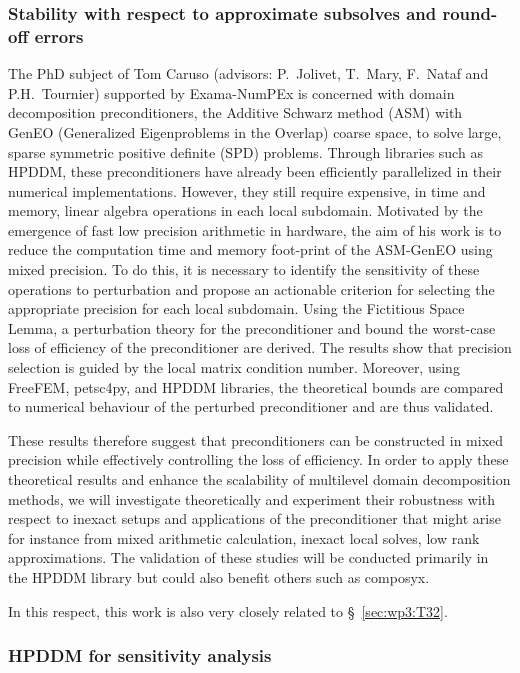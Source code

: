  \subsubsection{Stability with respect to approximate subsolves and round-off errors}
\label{sec:wp3:T31:ddmroundoff}
The PhD subject of Tom Caruso (advisors: P.~Jolivet, T.~Mary, F.~Nataf and P.H.~Tournier) supported by Exama-NumPEx is concerned with domain decomposition preconditioners, the Additive Schwarz method (ASM) with GenEO (Generalized Eigenproblems in the Overlap) coarse space, to solve large, sparse symmetric positive definite (SPD) problems. 
Through libraries such as HPDDM, these preconditioners have already been efficiently parallelized in their numerical implementations. 
However, they still require expensive, in time and memory, linear algebra operations in each local subdomain. 
Motivated by the emergence of fast low precision arithmetic in hardware, the aim of his work is to reduce the computation time and memory foot-print of the ASM-GenEO using mixed precision. 
To do this, it is necessary to identify the sensitivity of these operations to perturbation and propose an actionable criterion for selecting the appropriate precision for each local subdomain.
Using the Fictitious Space Lemma, a perturbation theory for the preconditioner and bound the worst-case loss of efficiency of the preconditioner are derived. The results show that  precision selection is guided by the local matrix condition number. 
Moreover, using FreeFEM, petsc4py, and HPDDM libraries, the theoretical bounds are compared to numerical behaviour of the perturbed preconditioner and are thus validated. 

These results therefore suggest that preconditioners can be constructed in mixed precision while effectively controlling the loss of efficiency. In order to apply these theoretical results and enhance the scalability of
multilevel domain decomposition methods, we will investigate theoretically and experiment their
robustness with respect to inexact setups and applications of the preconditioner that might arise for
instance from mixed arithmetic calculation, inexact local solves, low rank approximations. The
validation of these studies will be conducted primarily in the HPDDM library but could also benefit
others such as composyx. 


 In this respect, this work is also very closely related to \S~\ref{sec:wp3:T32}. 


 \subsubsection{HPDDM for sensitivity analysis}
 
